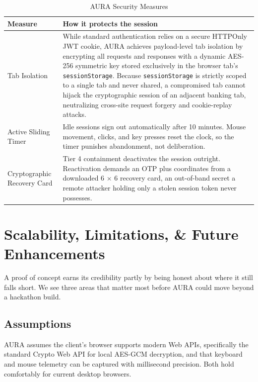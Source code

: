 \documentclass[11pt,journal,onecolumn]{article}
\begin{document}
\begin{table}[htbp]
\centering
\begin{tabular}{p{3.6cm}p{10.6cm}}
\hline

\textbf{Measure} & \textbf{How it protects the session} \\
\hline
Tab Isolation & While standard authentication relies on a secure HTTPOnly JWT cookie, AURA achieves payload-level tab isolation by encrypting all requests and responses with a dynamic AES-256 symmetric key stored exclusively in the browser tab's \texttt{sessionStorage}. Because \texttt{sessionStorage} is strictly scoped to a single tab and never shared, a compromised tab cannot hijack the cryptographic session of an adjacent banking tab, neutralizing cross-site request forgery and cookie-replay attacks. \\
Active Sliding Timer & Idle sessions sign out automatically after 10 minutes. Mouse movement, clicks, and key presses reset the clock, so the timer punishes abandonment, not deliberation. \\
Cryptographic Recovery Card & Tier 4 containment deactivates the session outright. Reactivation demands an OTP plus coordinates from a downloaded 6 $\times$ 6 recovery card, an out-of-band secret a remote attacker holding only a stolen session token never possesses. \\
\hline
\end{tabular}
\caption{AURA Security Measures}
\label{tab:security}
\end{table}

\section{Scalability, Limitations, \& Future Enhancements}
A proof of concept earns its credibility partly by being honest about where it still falls short. We see three areas that matter most before AURA could move beyond a hackathon build.

\subsection{Assumptions}
AURA assumes the client's browser supports modern Web APIs, specifically the standard Crypto Web API for local AES-GCM decryption, and that keyboard and mouse telemetry can be captured with millisecond precision. Both hold comfortably for current desktop browsers.
\end{document}
